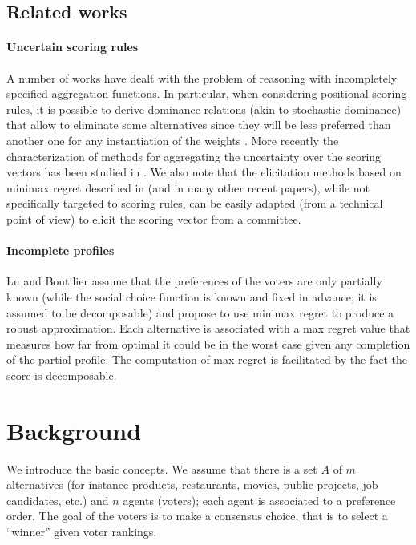 \documentclass[12pt]{article}
\newcommand{\ppref}{\succ^\text{p}}%
\begin{document}
\subsection{Related works}

\paragraph{Uncertain scoring rules}
A number of works have dealt with the problem of reasoning with incompletely specified aggregation functions.
In particular, when considering positional scoring rules, it is possible to derive dominance relations (akin to stochastic dominance) that allow to eliminate some alternatives since they will be less preferred than another one for any instantiation of the weights \cite{Stein1994}.
More recently the characterization of methods for aggregating the uncertainty over the scoring vectors has been studied in \cite{Viappiani2018}.
We also note that the elicitation methods based on minimax regret described in \cite{Boutilier2006} (and in many other recent papers), while not specifically targeted to scoring rules, can be easily adapted (from a technical point of view) to elicit the scoring vector from a committee.

\paragraph{Incomplete profiles}

Lu and Boutilier \cite{Lu2011} assume that the preferences of the voters are only partially known (while the social choice function is known and fixed in advance; it is assumed to be decomposable) and 
 propose to use minimax regret to produce a robust approximation.
Each alternative is associated with a max regret value that measures how far from optimal it could be in the worst case given any completion of the partial profile.
The computation of max regret is facilitated by the fact the score is decomposable.



\section{Background}\label{sec:background}

We introduce the basic concepts.
We assume that there is a set $A$ of $m$ alternatives (for instance products, restaurants, movies, public projects, job candidates, etc.) and $n$ agents (voters); each agent is associated to a preference order.
The goal of the voters is to make a consensus choice, that is to select a ``winner'' given voter rankings.
\end{document}
